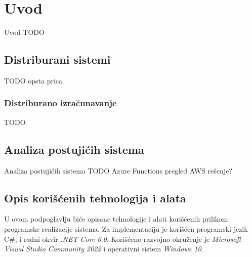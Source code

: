 \documentclass[12pt,oneside]{memoir}
\begin{document}
\frontmatter
\naslovna
\komisija
\apstrakt
\tableofcontents*

\mainmatter

\chapter{Uvod}
Uvod TODO

\section{Distriburani sistemi}
TODO opsta prica

\subsection{Distriburano izračunavanje}
TODO

\section{Analiza postujićih sistema}

Analiza postujićih sistema TODO
Azure Functions pregled
AWS rešenje?


\section{Opis korišćenih tehnologija i alata}

U ovom podpoglavlju biće opisane tehnologije i alati korišćenih prilikom programske realizacije sistema.
Za implementaciju je korišćen programski jezik C\#, i radni okvir \emph{.NET Core 6.0}. Korišćeno razvojno okruženje je \emph{Microsoft Visual Studio Community 2022} i operativni sistem \emph{Windows 10}.
\end{document}
